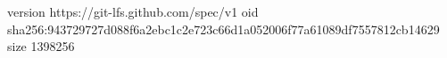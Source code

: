 version https://git-lfs.github.com/spec/v1
oid sha256:943729727d088f6a2ebc1c2e723c66d1a052006f77a61089df7557812cb14629
size 1398256
